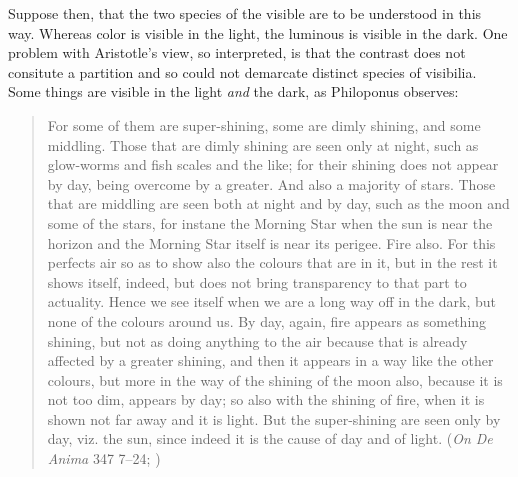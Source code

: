 Suppose then, that the two species of the visible are to be understood in this way. Whereas color is visible in the light, the luminous is visible in the dark. One problem with Aristotle's view, so interpreted, is that the contrast does not consitute a partition and so could not demarcate distinct species of visibilia. Some things are visible in the light \emph{and} the dark, as Philoponus observes:
\begin{quote}
	For some of them are super-shining, some are dimly shining, and some middling. Those that are dimly shining are seen only at night, such as glow-worms and fish scales and the like; for their shining does not appear by day, being overcome by a greater. And also a majority of stars. Those that are middling are seen both at night and by day, such as the moon and some of the stars, for instane the Morning Star when the sun is near the horizon and the Morning Star itself is near its perigee. Fire also. For this perfects air so as to show also the colours that are in it, but in the rest it shows itself, indeed, but does not bring transparency to that part to actuality. Hence we see itself when we are a long way off in the dark, but none of the colours around us. By day, again, fire appears as something shining, but not as doing anything to the air because that is already affected by a greater shining, and then it appears in a way like the other colours, but more in the way of the shining of the moon also, because it is not too dim, appears by day; so also with the shining of fire, when it is shown not far away and it is light. But the super-shining are seen only by day, viz. the sun, since indeed it is the cause of day and of light. (\emph{On \emph{De Anima}} 347 7--24; \citealt[32]{Charlton:2005fk})
\end{quote}

